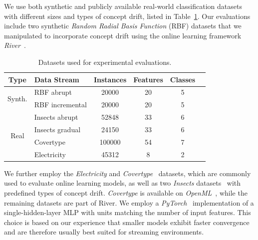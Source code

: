 \documentclass[runningheads]{llncs}
\begin{document}
We use both synthetic and publicly available real-world classification datasets with different sizes and types of concept drift, listed in Table~\ref{tab:datasets}.
Our evaluations include two synthetic \textit{Random Radial Basis Function} (RBF) datasets that we manipulated to incorporate concept drift using the online learning framework \textit{River}~\cite{montiel2021river}.

\begin{table}[ht]
	\centering
	\scriptsize
	\caption{Datasets used for experimental evaluations.}
	\begin{tabular}{@{}clcccc@{}}
		\toprule
		Type                    & Data Stream               & Instances & Features & Classes \\
		\midrule
		\multirow{2}{*}{Synth.} & RBF abrupt                & 20000     & 20       & 5       \\
		                        & RBF incremental           & 20000     & 20       & 5       \\
		\midrule
		\multirow{5}{*}{Real}   & Insects abrupt            & 52848     & 33       & 6       \\
		                        & Insects gradual           & 24150     & 33       & 6       \\
		                        & Covertype\footnotemark[3] & 100000    & 54       & 7       \\
		                        & Electricity               & 45312     & 8        & 2       \\
		\bottomrule
	\end{tabular}
	\label{tab:datasets}
\end{table}

We further employ the \textit{Electricity} and \textit{Covertype}~\cite{misc_covertype_31} datasets, which are commonly used to evaluate online learning models, as well as two \textit{Insects} datasets~\cite{souzaChallengesBenchmarkingStream2020} with predefined types of concept drift.
\textit{Covertype} is available on \textit{OpenML}~\cite{vanschorenOpenMLNetworkedScience2014}, while the remaining datasets are part of River.
We employ a \textit{PyTorch}~\cite{paszkePyTorchImperativeStyle2019} implementation of a single-hidden-layer MLP with units matching the number of input features.
This choice is based on our experience that smaller models exhibit faster convergence and are therefore usually best suited for streaming environments.
\end{document}
